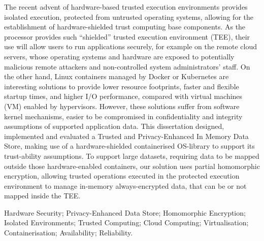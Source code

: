 The recent advent of hardware-based trusted execution environments provides isolated execution, protected from untrusted operating systems, allowing for the establishment of hardware-shielded trust computing base components. As the processor provides such “shielded” trusted execution environment (TEE), their use will allow users to run applications securely, for example on the remote cloud servers, whose operating systems and hardware are exposed to potentially malicious remote attackers and non-controlled system administrators’ staff. On the other hand, Linux containers managed by Docker or Kubernetes are interesting solutions to provide lower resource footprints, faster and flexible startup times, and higher I/O performance, compared with virtual machines (VM) enabled by hypervisors. However, these solutions suffer from software kernel mechanisms, easier to be compromised in confidentiality and integrity assumptions of supported application data.
This dissertation designed, implemented and evaluated a Trusted and Privacy-Enhanced In Memory Data Store, making use of a hardware-shielded containerised OS-library to support its trust-ability assumptions. To support large datasets, requiring data to be mapped outside those hardware-enabled containers, our solution uses partial homomorphic encryption, allowing trusted operations executed in the protected execution environment to manage in-memory always-encrypted data, that can be or not mapped inside the TEE.

\begin{keywords}
Hardware Security; Privacy-Enhanced Data Store; Homomorphic Encryption; Isolated Environments; Trusted Computing; Cloud Computing; Virtualisation; Containerisation; Availability; Reliability.
\end{keywords} 
